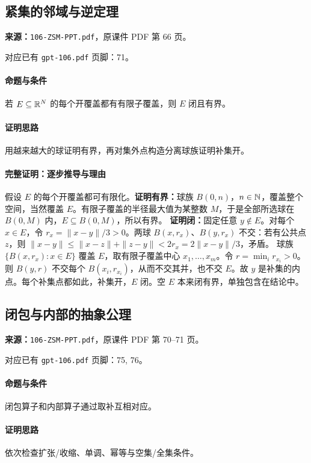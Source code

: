 \clearpage\subsection{紧集的邻域与逆定理}
\textbf{来源：}\texttt{106-ZSM-PPT.pdf}，原课件 PDF 第 66 页。\par
对应已有 \texttt{gpt-106.pdf} 页脚：71。\par
\paragraph{命题与条件}若 $E\subseteq\mathbb{R}^N$ 的每个开覆盖都有有限子覆盖，则 $E$ 闭且有界。
\paragraph{证明思路}用越来越大的球证明有界，再对集外点构造分离球族证明补集开。
\paragraph{完整证明：逐步推导与理由}

假设 $E$ 的每个开覆盖都可有限化。\textbf{证明有界：}球族 $B(0,n)$，$n\in\mathbb{N}$，覆盖整个空间，当然覆盖 $E$。有限子覆盖的半径最大值为某整数 $M$，于是全部所选球在 $B(0,M)$ 内，$E\subseteq B(0,M)$，所以有界。
\textbf{证明闭：}固定任意 $y\notin E$。对每个 $x\in E$，令 $r_x=\|x-y\|/3>0$。两球 $B(x,r_x)$、$B(y,r_x)$ 不交：若有公共点 $z$，则 $\|x-y\|\le\|x-z\|+\|z-y\|<2r_x=2\|x-y\|/3$，矛盾。
球族 $\{B(x,r_x):x\in E\}$ 覆盖 $E$，取有限子覆盖中心 $x_1,\ldots,x_m$。令 $r=\min_i r_{x_i}>0$。则 $B(y,r)$ 不交每个 $B(x_i,r_{x_i})$，从而不交其并，也不交 $E$。故 $y$ 是补集的内点。每个补集点都如此，补集开，$E$ 闭。空 $E$ 本来闭有界，单独包含在结论中。

\clearpage\subsection{闭包与内部的抽象公理}
\textbf{来源：}\texttt{106-ZSM-PPT.pdf}，原课件 PDF 第 70--71 页。\par
对应已有 \texttt{gpt-106.pdf} 页脚：75, 76。\par
\paragraph{命题与条件}闭包算子和内部算子通过取补互相对应。
\paragraph{证明思路}依次检查扩张/收缩、单调、幂等与空集/全集条件。

